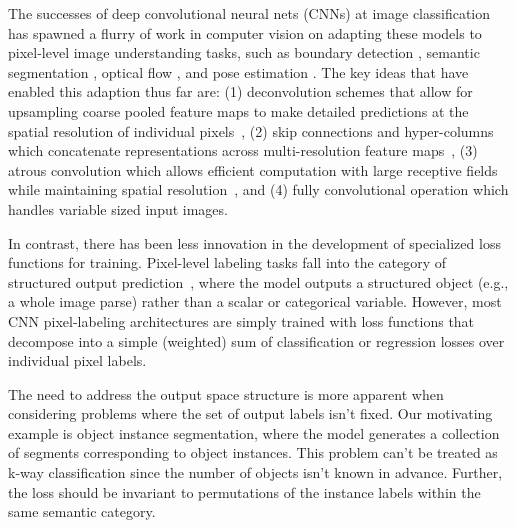 \documentclass[10pt,twocolumn,letterpaper]{article}
\begin{document}
The successes of deep convolutional neural nets (CNNs) at image classification
has spawned a flurry of work in computer vision on adapting these models to
pixel-level image understanding tasks, such as boundary detection
\cite{arbelaez2011contour, xie2015holistically, maninis2017convolutional},
semantic segmentation \cite{long2015fully,chen2016deeplab,kong2017recurrent},
optical flow \cite{weinzaepfel2013deepflow, dosovitskiy2015flownet}, and pose
estimation \cite{wei2016cpm, cao2017realtime}.  The key ideas that have enabled
this adaption thus far are: (1) deconvolution schemes that allow for upsampling
coarse pooled feature maps to make detailed predictions at the spatial
resolution of individual pixels~\cite{xie2015holistically,ghiasi2016laplacian},
(2) skip connections and hyper-columns which concatenate representations across
multi-resolution feature maps~\cite{hariharan2015hypercolumns,chen2016deeplab},
(3) atrous convolution which allows efficient computation with large receptive
fields while maintaining spatial resolution~\cite{chen2016deeplab,
kong2017recurrent}, and (4) fully convolutional operation which handles
variable sized input images.

In contrast, there has been less innovation in the development of specialized
loss functions for training. Pixel-level labeling tasks fall into the category
of structured output prediction~\cite{bakir2007predicting}, where the model
outputs a structured object (e.g., a whole image parse) rather than a scalar or
categorical variable.  However, most CNN pixel-labeling architectures are
simply trained with loss functions that decompose into a simple (weighted) sum
of classification or regression losses over individual pixel labels.

The need to address the output space structure is more apparent when
considering problems where the set of output labels isn't fixed.  Our
motivating example is object instance segmentation, where the model generates a
collection of segments corresponding to object instances.  This problem
can't be treated as k-way classification since the number of objects isn't
known in advance.  Further, the loss should be invariant to permutations of
the instance labels within the same semantic category.
\end{document}
